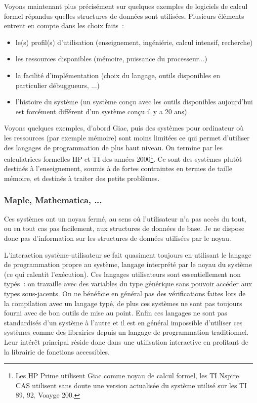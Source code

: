 \documentclass[a4paper,11pt]{article}
\begin{document}
\begin{giacjshere}
Voyons maintenant plus précisément sur quelques exemples de logiciels
de calcul formel r\'epandus quelles structures de données sont
utilisées. Plusieurs \'el\'ements entrent en compte dans les choix faits~:
\begin{itemize}
\item le(s) profil(s) d'utilisation (enseignement, ing\'eni\'erie,
calcul intensif, recherche)
\item les ressources disponibles (m\'emoire, puissance du processeur...)
\item la facilit\'e d'impl\'ementation (choix du langage, outils
disponibles en particulier d\'ebuggueurs, ...)
\item l'histoire du syst\`eme (un syst\`eme conçu avec les outils
disponibles aujourd'hui est forc\'ement diff\'erent d'un syst\`eme 
conçu il y a 20 ans)
\end{itemize}
Voyons quelques exemples, d'abord Giac, puis des syst\`emes 
pour ordinateur où les ressources
(par exemple m\'emoire) sont moins limit\'ees ce qui permet 
d'utiliser des langages de programmation de plus haut niveau.
On termine par les calculatrices formelles
HP et TI des ann\'ees 2000\footnote{Les HP Prime utilisent Giac comme
  noyau de calcul formel, les TI Nspire CAS utilisent sans doute une
  version actualis\'ee du syst\`eme utilis\'e sur les TI 89, 92,
  Voayge 200.}.
Ce sont des systèmes plutôt destinés à l'enseignement, soumis 
\`a de fortes contraintes en termes de taille m\'emoire, et destinés
à traiter des petits problèmes.


\subsubsection{Maple, Mathematica, ...}
Ces syst\`emes ont un noyau ferm\'e, au sens o\`u l'utilisateur n'a pas
acc\`es du tout, ou en tout cas pas facilement, aux structures de donn\'ees
de base. Je ne dispose donc pas d'information sur les structures de donn\'ees
utilis\'ees par le noyau.

L'interaction système-utilisateur se fait quasiment toujours en utilisant le
langage de programmation propre au syst\`eme, langage interpr\'et\'e
par le noyau du syst\`eme (ce qui ralentit l'exécution). Ces langages 
utilisateurs sont essentiellement
non typ\'es~: on travaille avec des variables du type générique sans pouvoir
accéder aux types sous-jacents. On ne bénéficie en g\'en\'eral pas des
v\'erifications faites lors de la compilation avec un langage typé,
de plus ces systèmes ne sont pas toujours fourni avec de bon outils de 
mise au point. Enfin ces langages ne sont pas standardisés d'un
système à l'autre et il est en général impossible
d'utiliser ces systèmes comme des librairies depuis un langage
de programmation traditionnel. Leur intérêt principal réside donc
dans une utilisation interactive en profitant de la librairie de 
fonctions accessibles.


\end{giacjshere}
\end{document}
